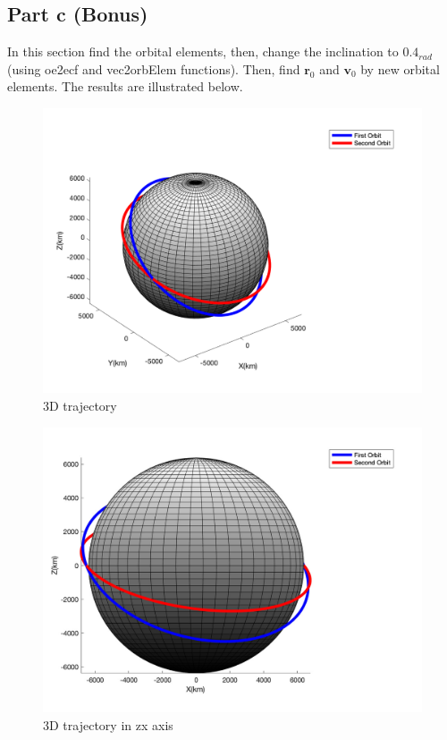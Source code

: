 \subsection{Part c (Bonus)}

In this section find the orbital elements, then, change the inclination to $0.4_{rad}$ (using oe2ecf and vec2orbElem functions). Then, find $\boldsymbol{r}_0$ and $\boldsymbol{v}_0$ by new orbital elements.
The results are illustrated below.
\begin{figure}[H]
    \caption{3D trajectory}
    \centering
    \includegraphics[width=16cm]{../Figure/Q2/3Dof_view_compare}
\end{figure}

\begin{figure}[H]
    \caption{3D trajectory in zx axis}
    \centering
    \includegraphics[width=16cm]{../Figure/Q2/xz_view_compare}
\end{figure}


